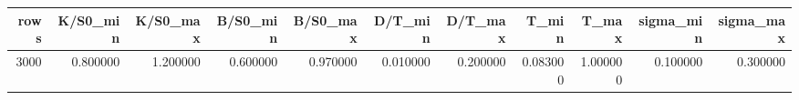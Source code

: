 \begin{tabular}{rrrrrrrrrrr}
\toprule
rows & K/S0_min & K/S0_max & B/S0_min & B/S0_max & D/T_min & D/T_max & T_min & T_max & sigma_min & sigma_max \\
\midrule
3000 & 0.800000 & 1.200000 & 0.600000 & 0.970000 & 0.010000 & 0.200000 & 0.083000 & 1.000000 & 0.100000 & 0.300000 \\
\bottomrule
\end{tabular}
